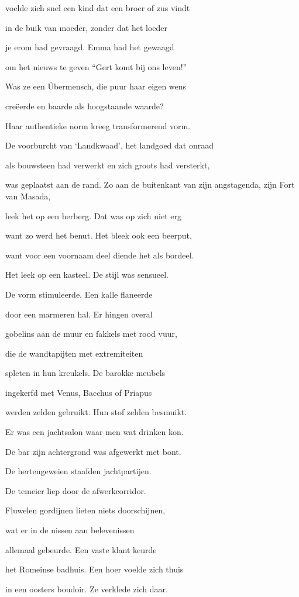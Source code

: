 voelde zich snel een kind
dat een broer of zus vindt

in de buik van moeder,
zonder dat het loeder

je erom had gevraagd.
Emma had het gewaagd

om het nieuws te geven
“Gert komt bij ons leven!”

Was ze een Übermensch,
die puur haar eigen wens

creëerde en baarde
als hoogstaande waarde?

Haar authentieke norm
kreeg transformerend vorm.

De voorburcht van ‘Landkwaad’,
het landgoed dat onraad

als bouwsteen had verwerkt
en zich groots had versterkt,

was geplaatst aan de rand.
Zo aan de buitenkant
van zijn angstagenda,
zijn Fort van Masada,

leek het op een herberg.
Dat was op zich niet erg

want zo werd het benut.
Het bleek ook een beerput,

want voor een voornaam deel
diende het als bordeel.

Het leek op een kasteel.
De stijl was sensueel.

De vorm stimuleerde.
Een kalle flaneerde

door een marmeren hal.
Er hingen overal

gobelins aan de muur
en fakkels met rood vuur,

die de wandtapijten
met extremiteiten

spleten in hun kreukels.
De barokke meubels

ingekerfd met Venus,
Bacchus of Priapus

werden zelden gebruikt.
Hun stof zelden besmuikt.

Er was een jachtsalon
waar men wat drinken kon.

De bar zijn achtergrond
was afgewerkt met bont.

De hertengeweien
staafden jachtpartijen.

De temeier liep door
de afwerkcorridor.

Fluwelen gordijnen
lieten niets doorschijnen,

wat er in de nissen
aan belevenissen

allemaal gebeurde.
Een vaste klant keurde

het Romeinse badhuis.
Een hoer voelde zich thuis

in een oosters boudoir.
Ze verklede zich daar.


